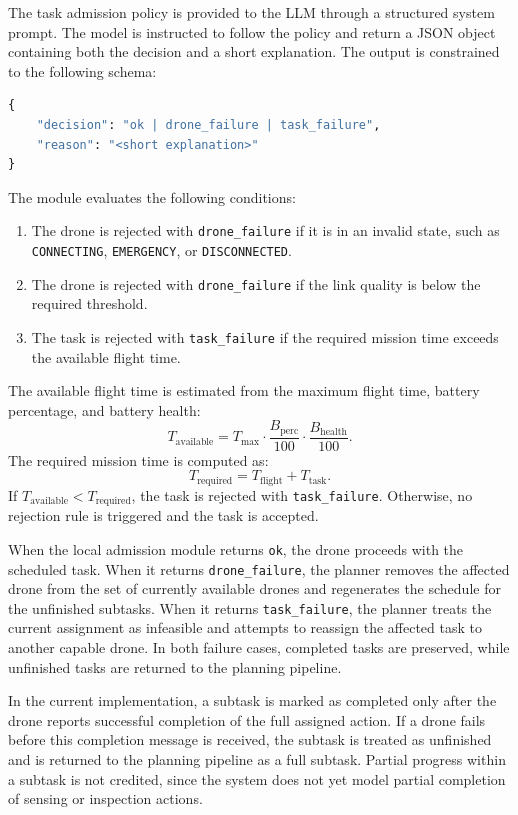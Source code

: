 The task admission policy is provided to the LLM through a structured system prompt. 
The model is instructed to follow the policy and return a JSON object containing both the decision and a short explanation. 
The output is constrained to the following schema:

\begin{lstlisting}[language=Python, numbers=none]
{
    "decision": "ok | drone_failure | task_failure",
    "reason": "<short explanation>"
}
\end{lstlisting}

The module evaluates the following conditions:

\begin{enumerate}
    \item The drone is rejected with \texttt{drone\_failure} if it is in an invalid state, 
    such as \texttt{CONNECTING}, \texttt{EMERGENCY}, or \texttt{DISCONNECTED}.
    \item The drone is rejected with \texttt{drone\_failure} if the link quality is below the required threshold.
    \item The task is rejected with \texttt{task\_failure} if the required mission time exceeds the available flight time.
\end{enumerate}

The available flight time is estimated from the maximum flight time, battery percentage, and battery health:
\[
T_{\text{available}} = T_{\text{max}} \cdot \frac{B_{\text{perc}}}{100} \cdot \frac{B_{\text{health}}}{100}.
\]
The required mission time is computed as:
\[
T_{\text{required}} = T_{\text{flight}} + T_{\text{task}}.
\]
If \(T_{\text{available}} < T_{\text{required}}\), the task is rejected with \texttt{task\_failure}. 
Otherwise, no rejection rule is triggered and the task is accepted.

When the local admission module returns \texttt{ok}, the drone proceeds with the scheduled task. 
When it returns \texttt{drone\_failure}, 
the planner removes the affected drone from the set of currently available drones 
and regenerates the schedule for the unfinished subtasks. 
When it returns \texttt{task\_failure}, 
the planner treats the current assignment as infeasible and attempts to reassign the affected task to another capable drone. 
In both failure cases, completed tasks are preserved, while unfinished tasks are returned to the planning pipeline.

In the current implementation, a subtask is marked as completed only after the drone reports
successful completion of the full assigned action. If a drone fails before this completion
message is received, the subtask is treated as unfinished and is
returned to the planning pipeline as a full subtask. Partial progress within a subtask is not
credited, since the system does not yet model partial completion of sensing or inspection
actions.


